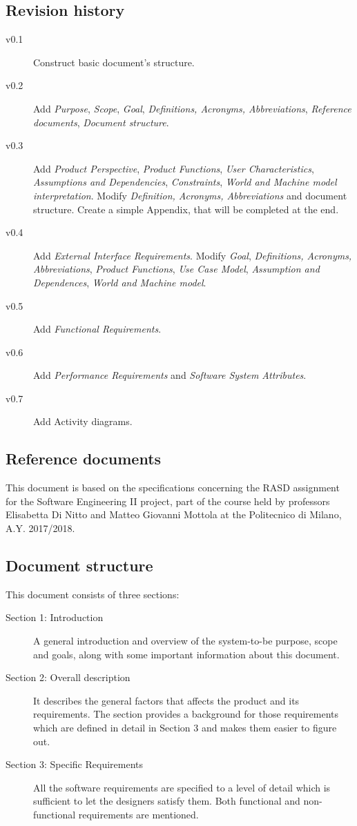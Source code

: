 \documentclass{article}
\begin{document}
	
	\subsection{Revision history}
	\begin{description}
		\item[v0.1] Construct basic document's structure.
		\item[v0.2] Add \textit{Purpose}, \textit{Scope}, \textit{Goal}, \textit{Definitions, Acronyms, Abbreviations}, \textit{Reference documents}, \textit{Document structure}.
		\item[v0.3] Add \textit{Product Perspective}, \textit{Product Functions}, \textit{User Characteristics}, \textit{Assumptions and Dependencies}, \textit{Constraints}, \textit{World and Machine model interpretation}. Modify \textit{Definition, Acronyms, Abbreviations} and document structure. Create a simple Appendix, that will be completed at the end.
		\item[v0.4] Add \textit{External Interface Requirements}. Modify \textit{Goal}, \textit{Definitions, Acronyms, Abbreviations}, \textit{Product Functions}, \textit{Use Case Model}, \textit{Assumption and Dependences}, \textit{World and Machine model}.
		\item[v0.5] Add \textit{Functional Requirements}.
		\item[v0.6] Add \textit{Performance Requirements} and \textit{Software System Attributes}.
		\item[v0.7] Add Activity diagrams.
	\end{description}
	
	
	\subsection{Reference documents}
	This document is based on the specifications concerning the RASD assignment for the Software Engineering II project, part of the course held by professors Elisabetta Di Nitto and Matteo Giovanni Mottola at the Politecnico di Milano, A.Y. 2017/2018.
	
	
	\subsection{Document structure}
	This document consists of three sections:

	\begin{description}
		\item[Section 1: Introduction] A general introduction and overview of the system-to-be purpose, scope and goals, along with some important information about this document.
		\item[Section 2: Overall description] It describes the general factors that affects the product and its requirements. The section provides a background for those requirements which are defined in detail in Section 3 and makes them easier to figure out.
		\item[Section 3: Specific Requirements] All the software requirements are specified to a level of detail which is sufficient to let the designers satisfy them. Both functional and non-functional requirements are mentioned.
	\end{description}
	
\end{document}

